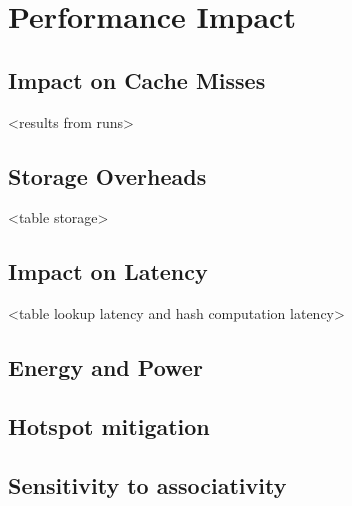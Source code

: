 \section{Performance Impact}
\subsection {Impact on Cache Misses} <results from runs>
\subsection {Storage Overheads} <table storage>
\subsection {Impact on Latency} <table lookup latency and hash computation latency>
\subsection {Energy and Power}
\subsection{Hotspot mitigation}
\subsection{Sensitivity to associativity}


